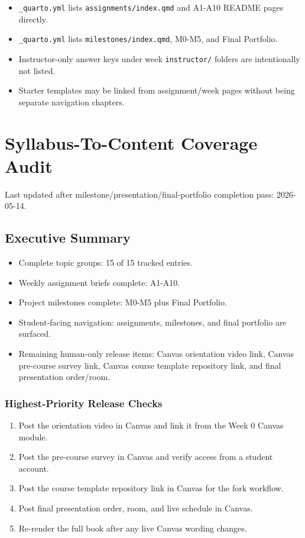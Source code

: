 \documentclass[
  letterpaper,
  DIV=11,
  numbers=noendperiod,
  oneside]{scrreprt}
\providecommand{\tightlist}{%
  \setlength{\itemsep}{0pt}\setlength{\parskip}{0pt}}
\begin{document}
\begin{itemize}
\tightlist
\item
  \texttt{\_quarto.yml} lists \texttt{assignments/index.qmd} and A1-A10
  README pages directly.
\item
  \texttt{\_quarto.yml} lists \texttt{milestones/index.qmd}, M0-M5, and
  Final Portfolio.
\item
  Instructor-only answer keys under week \texttt{instructor/} folders
  are intentionally not listed.
\item
  Starter templates may be linked from assignment/week pages without
  being separate navigation chapters.
\end{itemize}

\chapter{Syllabus-To-Content Coverage
Audit}\label{syllabus-to-content-coverage-audit}

Last updated after milestone/presentation/final-portfolio completion
pass: 2026-05-14.

\section{Executive Summary}\label{executive-summary}

\begin{itemize}
\tightlist
\item
  Complete topic groups: 15 of 15 tracked entries.
\item
  Weekly assignment briefs complete: A1-A10.
\item
  Project milestones complete: M0-M5 plus Final Portfolio.
\item
  Student-facing navigation: assignments, milestones, and final
  portfolio are surfaced.
\item
  Remaining human-only release items: Canvas orientation video link,
  Canvas pre-course survey link, Canvas course template repository link,
  and final presentation order/room.
\end{itemize}

\subsection{Highest-Priority Release
Checks}\label{highest-priority-release-checks}

\begin{enumerate}
\def\labelenumi{\arabic{enumi}.}
\tightlist
\item
  Post the orientation video in Canvas and link it from the Week 0
  Canvas module.
\item
  Post the pre-course survey in Canvas and verify access from a student
  account.
\item
  Post the course template repository link in Canvas for the fork
  workflow.
\item
  Post final presentation order, room, and live schedule in Canvas.
\item
  Re-render the full book after any live Canvas wording changes.
\end{enumerate}
\end{document}

